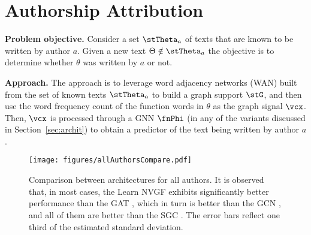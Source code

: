 

\section{Authorship Attribution}

\textbf{Problem objective.} Consider a set $\stTheta_{a}$ of texts that are known to be written by author $a$. Given a new text $\theta \notin \stTheta_{a}$ the objective is to determine whether $\theta$ was written by $a$ or not.

\textbf{Approach.} The approach is to leverage word adjacency networks (WAN) built from the set of known texts $\stTheta_{a}$ to build a graph support $\stG$, and then use the word frequency count of the function words in $\theta$ as the graph signal $\vcx$. Then, $\vcx$ is processed through a GNN $\fnPhi$ (in any of the variants discussed in Section~\ref{sec:archit}) to obtain a predictor of the text being written by author $a$.

\begin{figure*}
    \centering
    \texttt{[image: figures/allAuthorsCompare.pdf]}
    \caption{Comparison between architectures for all authors. It is observed that, in most cases, the Learn NVGF exhibits significantly better performance than the GAT \cite{Velickovic2018-GAT}, which in turn is better than the GCN \cite{Kipf2017-GCN}, and all of them are better than the SGC \cite{Weinberger2019-SGC}. The error bars reflect one third of the estimated standard deviation.}
    \label{fig:app:allAuthors:compare}
\end{figure*}


